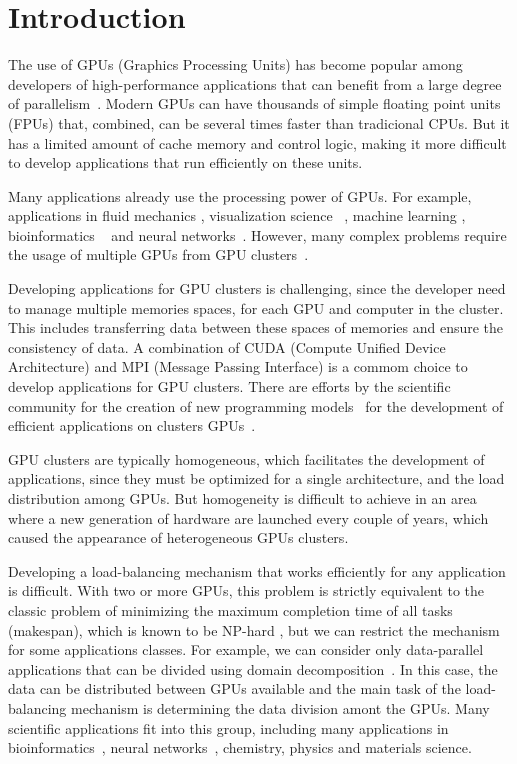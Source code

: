 \documentclass[journal]{IEEEtran}
\begin{document}
\section{Introduction}

The use of GPUs (Graphics Processing Units) has become popular
among developers of high-performance applications that can benefit from a large
degree of parallelism~\cite{gpu2}. Modern GPUs can have thousands of simple
floating point units (FPUs) that, combined, can be several times faster than
tradicional CPUs. But it has a limited amount of cache memory and control logic,
making it more difficult to develop applications that run efficiently on these
units.

Many applications already use the processing power of GPUs. For example,
applications in fluid mechanics \cite{fluid2}, visualization science
~\cite{visualization2}, machine learning \cite{learning2}, bioinformatics
~\cite{bioinformatica2} and neural networks~\cite{neural}. However, many complex
problems require the usage of multiple GPUs from GPU clusters~\cite{raphael,
  cluster}.

Developing applications for GPU clusters is challenging, since the developer
need to manage multiple memories spaces, for each GPU and computer in the
cluster. This includes transferring data between these spaces of memories and
ensure the consistency of data. A combination of CUDA (Compute Unified Device
Architecture) and MPI (Message Passing Interface) is a commom choice to develop
applications for GPU clusters. There are efforts by the scientific community for
the creation of new programming models~\cite{appCientificas, wave} for the
development of efficient applications on clusters GPUs~\cite{snucl, Flat,
  starpu}.

GPU clusters are typically homogeneous, which facilitates the development of
applications, since they must be optimized for a single architecture, and the
load distribution among GPUs. But homogeneity is difficult to achieve in an area
where a new generation of hardware are launched every couple of years, which
caused the appearance of heterogeneous GPUs clusters.

Developing a load-balancing mechanism that works efficiently for any application
is difficult. With two or more GPUs, this problem is strictly equivalent to the
classic problem of minimizing the maximum completion time of all tasks
(makespan), which is known to be NP-hard \cite{GaJo1979}, but we can restrict
the mechanism for some applications classes. For example, we can consider only
data-parallel applications that can be divided using domain
decomposition~\cite{Gropp:1992uq}. In this case, the data can be distributed
between GPUs available and the main task of the load-balancing mechanism is
determining the data division amont the GPUs.  Many scientific applications fit
into this group, including many applications in bioinformatics~\cite{bioinformatica2},
neural networks~\cite{neural}, chemistry, physics and materials science.
\end{document}
